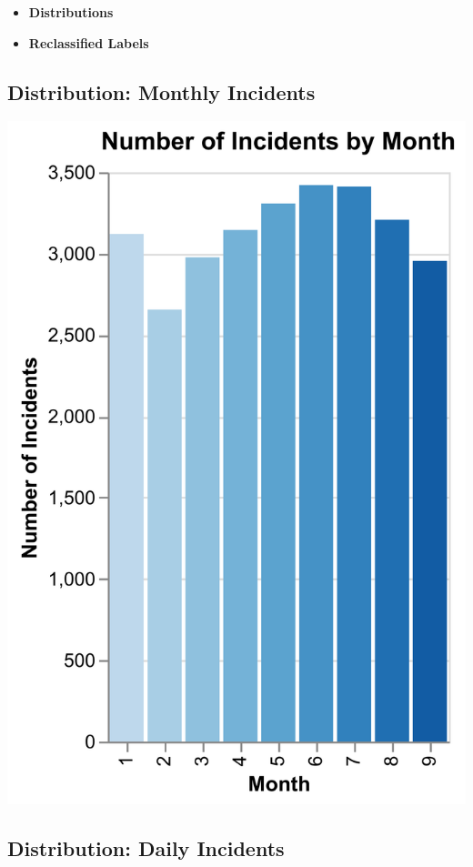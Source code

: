 \documentclass[
  letterpaper,
  DIV=11,
  numbers=noendperiod]{scrartcl}
\providecommand{\tightlist}{%
  \setlength{\itemsep}{0pt}\setlength{\parskip}{0pt}}\usepackage{longtable,booktabs,array}
\begin{document}
\begin{itemize}
\tightlist
\item
  \textbf{Distributions}
\item
  \textbf{Reclassified Labels}
\end{itemize}

\subsection{Distribution: Monthly
Incidents}\label{distribution-monthly-incidents}

\begin{center}
\includegraphics{results/images/incidents_by_month.png}
\end{center}

\subsection{Distribution: Daily
Incidents}\label{distribution-daily-incidents}
\end{document}
